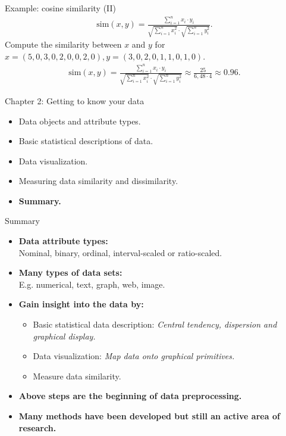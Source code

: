\documentclass[aspectratio=169,t]{beamer}
\begin{document}
  { 
    \begin{frame}{Example: cosine similarity (II)}
    \begin{align}
      \text{sim}(x,y) = \frac{\sum_{i=1}^{n} x_i \cdot y_i}{\sqrt{\sum_{i=1}^{n}x_i^2}\cdot \sqrt{\sum_{i=1}^{n} y_i^2}}.
    \end{align}
    Compute the similarity between $x$ and $y$ for $x = (5,0,3,0,2,0,0,2,0), y = (3,0,2,0,1,1,0,1,0).$
    \begin{align}
      \text{sim}(x,y) = \frac{\sum_{i=1}^{n} x_i \cdot y_i}{\sqrt{\sum_{i=1}^{n}x_i^2}\cdot \sqrt{\sum_{i=1}^{n} y_i^2}} \approx \frac{25}{6,48 \cdot 4} \approx 0.96.
    \end{align}
    \end{frame}
  }

  { 
    \begin{frame}{Chapter 2: Getting to know your data}
    \centering
    \begin{itemize}
        \item Data objects and attribute types.
        \item Basic statistical descriptions of data.
        \item Data visualization.
        \item Measuring data similarity and dissimilarity.
        \item \textbf{Summary.}
    \end{itemize}
    \end{frame}
  }

  { 
    \begin{frame}{Summary}
    \centering
    \begin{itemize}
        \item \textbf{Data attribute types:}\\
              Nominal, binary, ordinal, interval-scaled or ratio-scaled.
        \item \textbf{Many types of data sets:}\\
              E.g. numerical, text, graph, web, image.
        \item \textbf{Gain insight into the data by:}
        \begin{itemize}
          \item Basic statistical data description: \emph{Central tendency, dispersion and graphical display.}
          \item Data visualization: \emph{Map data onto graphical primitives.}
          \item Measure data similarity.
        \end{itemize}
        \item \textbf{Above steps are the beginning of data preprocessing.}
        \item \textbf{Many methods have been developed but still an active area of research.}
    \end{itemize}
    \end{frame}
  }
\end{document}
